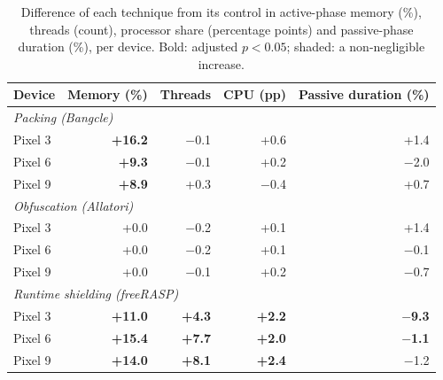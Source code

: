 \begin{table}[t]
\centering
\small
\setlength{\tabcolsep}{4pt}
\caption{Difference of each technique from its control in active-phase memory (\%), threads (count), processor share (percentage points) and passive-phase duration (\%), per device. Bold: adjusted $p < 0.05$; shaded: a non-negligible increase.}
\label{tab:rq4}
\begin{tabular}{lrrrr}
\toprule
\textbf{Device} & \textbf{Memory (\%)} & \textbf{Threads} & \textbf{CPU (pp)} & \textbf{Passive duration (\%)} \\
\midrule
\multicolumn{5}{l}{\textit{Packing (Bangcle)}} \\
Pixel 3 & \cellcolor{red!12}\textbf{+16.2} & $-$0.1 & +0.6 & +1.4 \\
Pixel 6 & \cellcolor{red!12}\textbf{+9.3} & $-$0.1 & +0.2 & $-$2.0 \\
Pixel 9 & \cellcolor{red!12}\textbf{+8.9} & +0.3 & $-$0.4 & +0.7 \\
\midrule
\multicolumn{5}{l}{\textit{Obfuscation (Allatori)}} \\
Pixel 3 & +0.0 & $-$0.2 & +0.1 & +1.4 \\
Pixel 6 & +0.0 & $-$0.2 & +0.1 & $-$0.1 \\
Pixel 9 & +0.0 & $-$0.1 & +0.2 & $-$0.7 \\
\midrule
\multicolumn{5}{l}{\textit{Runtime shielding (freeRASP)}} \\
Pixel 3 & \cellcolor{red!12}\textbf{+11.0} & \cellcolor{red!12}\textbf{+4.3} & \cellcolor{red!12}\textbf{+2.2} & \textbf{$-$9.3} \\
Pixel 6 & \cellcolor{red!12}\textbf{+15.4} & \cellcolor{red!12}\textbf{+7.7} & \cellcolor{red!12}\textbf{+2.0} & \textbf{$-$1.1} \\
Pixel 9 & \cellcolor{red!12}\textbf{+14.0} & \cellcolor{red!12}\textbf{+8.1} & \textbf{+2.4} & $-$1.2 \\
\bottomrule
\end{tabular}
\end{table}
